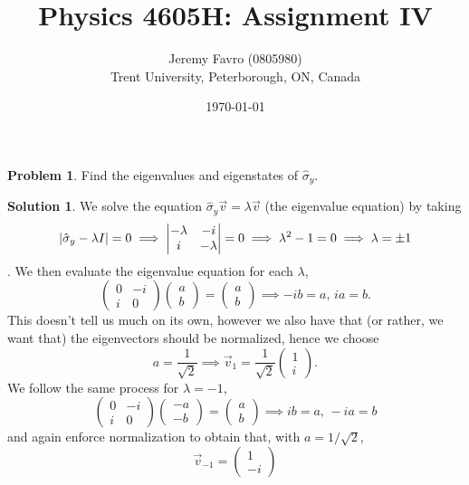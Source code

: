 \documentclass[10pt]{article}
\title{Physics 4605H: Assignment IV}
\author{Jeremy Favro (0805980) \\ Trent University, Peterborough, ON, Canada}
\date{\today}
\theoremstyle{definition}
\newtheorem{problem}{Problem}
\newtheorem{soln}{Solution}
\newcommand{\bv}[1]{\vec{#1}}
\begin{document}
\maketitle


\begin{problem}
Find the eigenvalues and eigenstates of $\hat{\sigma}_y$.
\end{problem}
\begin{soln}
  We solve the equation $\hat{\sigma}_y\bv{v}=\lambda\bv{v}$ (the eigenvalue equation) by taking
  $$\abs{\hat{\sigma}_y-\lambda I}=0\implies \begin{vmatrix}
      -\lambda & -i       \\
      i        & -\lambda
    \end{vmatrix}=0\implies \lambda^2-1=0\implies \lambda=\pm 1$$. We then evaluate the eigenvalue equation for each $\lambda$,
  $$\begin{pmatrix}
      0 & -i \\
      i & 0
    \end{pmatrix}\begin{pmatrix}
      a \\b
    \end{pmatrix}=\begin{pmatrix}
      a \\
      b
    \end{pmatrix}\implies -ib=a,\,ia=b.$$
  This doesn't tell us much on its own, however we also have that (or rather, we want that) the eigenvectors should be normalized, hence we choose
  $$a=\frac{1}{\sqrt{2}}\implies \bv{v}_1=\frac{1}{\sqrt{2}}\begin{pmatrix}
      1 \\i
    \end{pmatrix}.$$
  We follow the same process for $\lambda=-1$,
  $$\begin{pmatrix}
      0 & -i \\
      i & 0
    \end{pmatrix}\begin{pmatrix}
      -a \\-b
    \end{pmatrix}=\begin{pmatrix}
      a \\
      b
    \end{pmatrix}\implies ib=a,\,-ia=b$$
  and again enforce normalization to obtain that, with $a=1/\sqrt{2}$,
  $$\bv{v}_{-1}=\begin{pmatrix}
      1 \\
      -i
    \end{pmatrix}$$
\end{soln}
\end{document}
